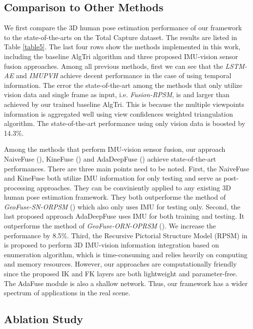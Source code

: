 \documentclass[lettersize,journal]{IEEEtran}
\begin{document}
\subsection{Comparison to Other Methods}

We first compare the 3D human pose estimation performance of our framework to the state-of-the-arts on the Total Capture dataset. The results are listed in Table \ref{table5}. The last four rows show the methods implemented in this work, including the baseline AlgTri algorithm and three proposed IMU-vision sensor fusion approaches. Among all previous methods, first we can see that the \emph{LSTM-AE}\cite{trumble2018deep} and \emph{IMUPVH}\cite{gilbert2019fusing} achieve decent performance in the case of using temporal information. The error the state-of-the-art among the methods that only utilize vision data and single frame as input, i.e. \emph{Fusion-RPSM}\cite{qiu2019cross}, is  and larger than  achieved by our trained baseline AlgTri. This is because the multiple viewpoints information is aggregated well using view confidences weighted triangulation algorithm. The state-of-the-art performance using only vision data is boosted by 14.3\%. 

Among the methods that perform IMU-vision sensor fusion, our approach NaiveFuse (), KineFuse () and AdaDeepFuse () achieve state-of-the-art performances. There are three main points need to be noted. First, the NaiveFuse and KineFuse both utilize IMU information for only testing and serve as post-processing approaches. They can be conviniently applied to any existing 3D human pose estimation framework. They both outperforme the method of \emph{GeoFuse-SN-ORPSM}\cite{zhang2020fusing} () which also only uses IMU for testing only. Second, the last proposed approach AdaDeepFuse uses IMU for both training and testing. It outperforms the method of \emph{GeoFuse-ORN-OPRSM}\cite{zhang2020fusing} (). We increase the performance by 8.5\%. Third, the Recursive Pictorial Structure Model (RPSM) in \cite{zhang2020fusing} is proposed to perform 3D IMU-vision information integration based on enumeration algorithm, which is time-consuming and relies heavily on computing and memory resources. However, our approaches are computationally friendly since the proposed IK and FK layers are both lightweight and parameter-free. The AdaFuse module is also a shallow network. Thus, our framework has a wider spectrum of applications in the real scene.

\subsection{Ablation Study}
\end{document}
